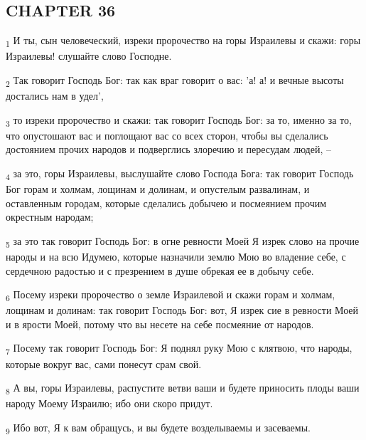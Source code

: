 \subsection{CHAPTER 36}
\begin{tcolorbox}
\textsubscript{1} И ты, сын человеческий, изреки пророчество на горы Израилевы и скажи: горы Израилевы! слушайте слово Господне.
\end{tcolorbox}
\begin{tcolorbox}
\textsubscript{2} Так говорит Господь Бог: так как враг говорит о вас: 'а! а! и вечные высоты достались нам в удел',
\end{tcolorbox}
\begin{tcolorbox}
\textsubscript{3} то изреки пророчество и скажи: так говорит Господь Бог: за то, именно за то, что опустошают вас и поглощают вас со всех сторон, чтобы вы сделались достоянием прочих народов и подверглись злоречию и пересудам людей, --
\end{tcolorbox}
\begin{tcolorbox}
\textsubscript{4} за это, горы Израилевы, выслушайте слово Господа Бога: так говорит Господь Бог горам и холмам, лощинам и долинам, и опустелым развалинам, и оставленным городам, которые сделались добычею и посмеянием прочим окрестным народам;
\end{tcolorbox}
\begin{tcolorbox}
\textsubscript{5} за это так говорит Господь Бог: в огне ревности Моей Я изрек слово на прочие народы и на всю Идумею, которые назначили землю Мою во владение себе, с сердечною радостью и с презрением в душе обрекая ее в добычу себе.
\end{tcolorbox}
\begin{tcolorbox}
\textsubscript{6} Посему изреки пророчество о земле Израилевой и скажи горам и холмам, лощинам и долинам: так говорит Господь Бог: вот, Я изрек сие в ревности Моей и в ярости Моей, потому что вы несете на себе посмеяние от народов.
\end{tcolorbox}
\begin{tcolorbox}
\textsubscript{7} Посему так говорит Господь Бог: Я поднял руку Мою с клятвою, что народы, которые вокруг вас, сами понесут срам свой.
\end{tcolorbox}
\begin{tcolorbox}
\textsubscript{8} А вы, горы Израилевы, распустите ветви ваши и будете приносить плоды ваши народу Моему Израилю; ибо они скоро придут.
\end{tcolorbox}
\begin{tcolorbox}
\textsubscript{9} Ибо вот, Я к вам обращусь, и вы будете возделываемы и засеваемы.
\end{tcolorbox}
